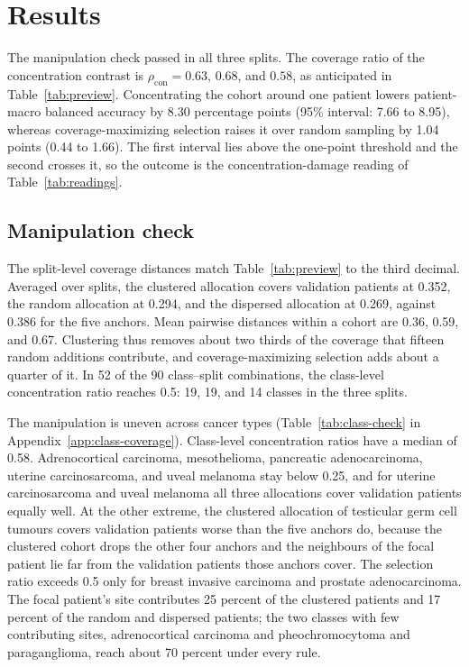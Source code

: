 \section{Results}
\label{sec:results}
The manipulation check passed in all three splits. The coverage ratio of the concentration contrast is $\rho_{\mathrm{con}}=0.63$, $0.68$, and $0.58$, as anticipated in Table~\ref{tab:preview}. Concentrating the cohort around one patient lowers patient-macro balanced accuracy by 8.30 percentage points (95\% interval: 7.66 to 8.95), whereas coverage-maximizing selection raises it over random sampling by 1.04 points (0.44 to 1.66). The first interval lies above the one-point threshold and the second crosses it, so the outcome is the concentration-damage reading of Table~\ref{tab:readings}.

\subsection{Manipulation check}
\label{sec:check-results}
The split-level coverage distances match Table~\ref{tab:preview} to the third decimal. Averaged over splits, the clustered allocation covers validation patients at 0.352, the random allocation at 0.294, and the dispersed allocation at 0.269, against 0.386 for the five anchors. Mean pairwise distances within a cohort are 0.36, 0.59, and 0.67. Clustering thus removes about two thirds of the coverage that fifteen random additions contribute, and coverage-maximizing selection adds about a quarter of it. In 52 of the 90 class--split combinations, the class-level concentration ratio reaches 0.5: 19, 19, and 14 classes in the three splits.

The manipulation is uneven across cancer types (Table~\ref{tab:class-check} in Appendix~\ref{app:class-coverage}). Class-level concentration ratios have a median of 0.58. Adrenocortical carcinoma, mesothelioma, pancreatic adenocarcinoma, uterine carcinosarcoma, and uveal melanoma stay below 0.25, and for uterine carcinosarcoma and uveal melanoma all three allocations cover validation patients equally well. At the other extreme, the clustered allocation of testicular germ cell tumours covers validation patients worse than the five anchors do, because the clustered cohort drops the other four anchors and the neighbours of the focal patient lie far from the validation patients those anchors cover. The selection ratio exceeds 0.5 only for breast invasive carcinoma and prostate adenocarcinoma. The focal patient's site contributes 25 percent of the clustered patients and 17 percent of the random and dispersed patients; the two classes with few contributing sites, adrenocortical carcinoma and pheochromocytoma and paraganglioma, reach about 70 percent under every rule.

